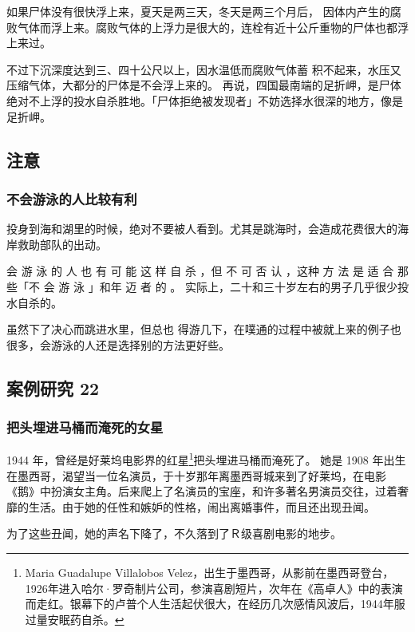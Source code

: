 \documentclass[UTF8]{ctexart}
\begin{document}
如果尸体没有很快浮上来，夏天是两三天，冬天是两三个月后， 因体内产生的腐败气体而浮上来。腐败气体的上浮力是很大的，连栓有近十公斤重物的尸体也都浮上来过。

不过下沉深度达到三、四十公尺以上，因水温低而腐败气体蓄 积不起来，水压又压缩气体，大都分的尸体是不会浮上来的。 再说，四国最南端的足折岬，是尸体绝对不上浮的投水自杀胜地。「尸体拒绝被发现者」不妨选择水很深的地方，像是足折岬。



\subsection{注意}

\subsubsection*{不会游泳的人比较有利}

投身到海和湖里的时候，绝对不要被人看到。尤其是跳海时，会造成花费很大的海岸救助部队的出动。

会 游 泳 的 人 也 有 可 能 这 样 自 杀 ，但 不 可 否 认 ，这种 方 法 是 适 合 那 些「不 会 游 泳 」和年 迈 者 的 。 实际上，二十和三十岁左右的男子几乎很少投水自杀的。

虽然下了决心而跳进水里，但总也 得游几下，在噗通的过程中被就上来的例子也很多，会游泳的人还是选择别的方法更好些。





\subsection{案例研究 22}

\subsubsection*{把头埋进马桶而淹死的女星}

1944 年，曾经是好莱坞电影界的红星\footnote{Maria Guadalupe Villalobos Velez，出生于墨西哥，从影前在墨西哥登台，1926年进入哈尔·罗奇制片公司，参演喜剧短片，次年在《高卓人》中的表演而走红。银幕下的卢普个人生活起伏很大，在经历几次感情风波后，1944年服过量安眠药自杀。}把头埋进马桶而淹死了。
她是 1908 年出生在墨西哥，渴望当一位名演员，于十岁那年离墨西哥城来到了好莱坞，在电影《鹅》中扮演女主角。后来爬上了名演员的宝座，和许多著名男演员交往，过着奢靡的生活。由于她的任性和嫉妒的性格，闹出离婚事件，而且还出现丑闻。

为了这些丑闻，她的声名下降了，不久落到了Ｒ级喜剧电影的地步。
\end{document}
